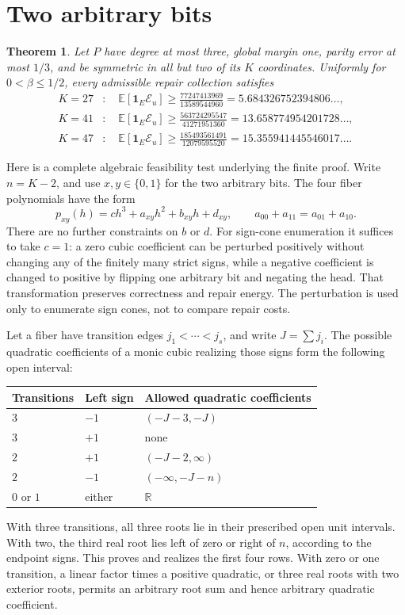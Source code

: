 \documentclass[11pt]{article}
\newtheorem{theorem}{Theorem}
\newcommand{\E}{\mathbb E}
\newcommand{\cost}{\mathcal E}
\begin{document}
\section{Two arbitrary bits}
\begin{theorem}\label{thm:twofree}
Let $P$ have degree at most three, global margin one, parity error at most $1/3$, and be symmetric in all but two of its $K$ coordinates. Uniformly for $0<\beta\le1/2$, every admissible repair collection satisfies
\begin{align*}
 K=27&:\quad \E[\mathbf1_E\cost_u]\ge\frac{77247413969}{13589544960}
 =5.684326752394806\ldots,\\
 K=41&:\quad \E[\mathbf1_E\cost_u]\ge\frac{563724295547}{41271951360}
 =13.658774954201728\ldots,\\
 K=47&:\quad \E[\mathbf1_E\cost_u]\ge\frac{185493561491}{12079595520}
 =15.355941445546017\ldots.
\end{align*}
\end{theorem}
Here is a complete algebraic feasibility test underlying the finite proof. Write $n=K-2$, and use $x,y\in\{0,1\}$ for the two arbitrary bits. The four fiber polynomials have the form
\[
 p_{xy}(h)=c h^3+a_{xy}h^2+b_{xy}h+d_{xy},\qquad
 a_{00}+a_{11}=a_{01}+a_{10}.
\]
There are no further constraints on $b$ or $d$. For sign-cone enumeration it suffices to take $c=1$: a zero cubic coefficient can be perturbed positively without changing any of the finitely many strict signs, while a negative coefficient is changed to positive by flipping one arbitrary bit and negating the head. That transformation preserves correctness and repair energy. The perturbation is used only to enumerate sign cones, not to compare repair costs.

Let a fiber have transition edges $j_1<\cdots<j_s$, and write $J=\sum j_i$. The possible quadratic coefficients of a monic cubic realizing those signs form the following open interval:
\begin{center}
\begin{tabular}{lll}\toprule
Transitions & Left sign & Allowed quadratic coefficients\\\midrule
$3$ & $-1$ & $(-J-3,-J)$\\
$3$ & $+1$ & none\\
$2$ & $+1$ & $(-J-2,\infty)$\\
$2$ & $-1$ & $(-\infty,-J-n)$\\
$0$ or $1$ & either & $\mathbb R$\\\bottomrule
\end{tabular}
\end{center}
With three transitions, all three roots lie in their prescribed open unit intervals. With two, the third real root lies left of zero or right of $n$, according to the endpoint signs. This proves and realizes the first four rows. With zero or one transition, a linear factor times a positive quadratic, or three real roots with two exterior roots, permits an arbitrary root sum and hence arbitrary quadratic coefficient.
\end{document}
